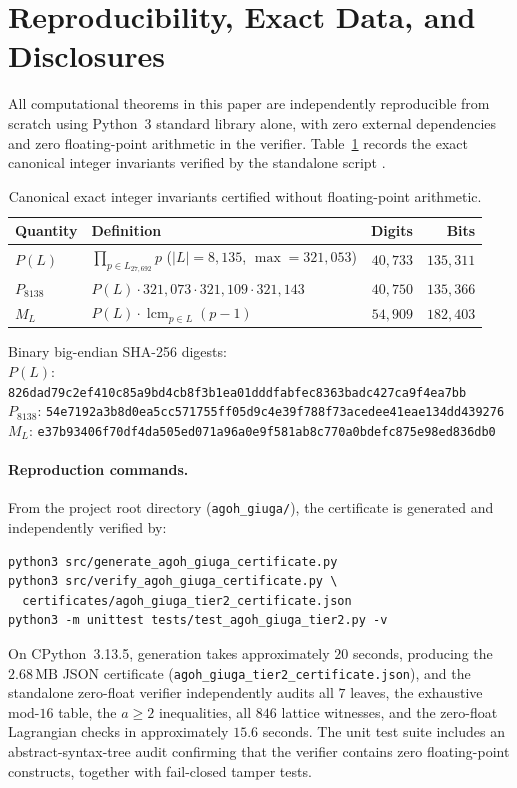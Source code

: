 \documentclass[11pt]{article}
\theoremstyle{remark}
\begin{document}
\section{Reproducibility, Exact Data, and Disclosures}\label{sec:repro}

All computational theorems in this paper are independently reproducible from
scratch using Python~3 standard library alone, with zero external dependencies
and zero floating-point arithmetic in the verifier. Table~\ref{tab:digests}
records the exact canonical integer invariants verified by the standalone
script .

\begin{table}[htbp]
\centering
\caption{Canonical exact integer invariants certified without floating-point arithmetic.}
\label{tab:digests}
\small
\begin{tabular}{llrr}
\toprule
Quantity & Definition & Digits & Bits \\
\midrule
$P(L)$ & $\prod_{p\in L_{27,692}} p$ ($|L|=8{,}135$, $\max=321{,}053$) & $40{,}733$ & $135{,}311$ \\
$P_{8138}$ & $P(L)\cdot 321{,}073\cdot 321{,}109\cdot 321{,}143$ & $40{,}750$ & $135{,}366$ \\
$M_L$ & $P(L)\cdot \operatorname{lcm}_{p\in L}(p-1)$ & $54{,}909$ & $182{,}403$ \\
\bottomrule
\end{tabular}

\vspace{0.25em}
\footnotesize
Binary big-endian SHA-256 digests:\\
$P(L)$: \texttt{826dad79c2ef410c85a9bd4cb8f3b1ea01dddfabfec8363badc427ca9f4ea7bb}\\
$P_{8138}$: \texttt{54e7192a3b8d0ea5cc571755ff05d9c4e39f788f73acedee41eae134dd439276}\\
$M_L$: \texttt{e37b93406f70df4da505ed071a96a0e9f581ab8c770a0bdefc875e98ed836db0}
\end{table}

\paragraph{Reproduction commands.}
From the project root directory (\texttt{agoh\_giuga/}), the certificate is
generated and independently verified by:
{\small
\begin{verbatim}
python3 src/generate_agoh_giuga_certificate.py
python3 src/verify_agoh_giuga_certificate.py \
  certificates/agoh_giuga_tier2_certificate.json
python3 -m unittest tests/test_agoh_giuga_tier2.py -v
\end{verbatim}
}
On CPython~3.13.5, generation takes approximately $20$ seconds, producing the
$2.68\,\mathrm{MB}$ JSON certificate
(\texttt{agoh\_giuga\_tier2\_certificate.json}), and the standalone zero-float
verifier independently audits all $7$ leaves, the exhaustive mod-$16$ table,
the $a \ge 2$ inequalities, all $846$ lattice witnesses, and the zero-float
Lagrangian checks in approximately $15.6$ seconds. The unit test suite includes
an abstract-syntax-tree audit confirming that the verifier contains zero
floating-point constructs, together with fail-closed tamper tests.
\end{document}
